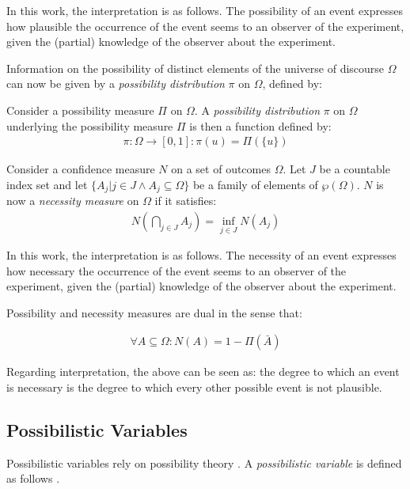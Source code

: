In this work, the interpretation is as follows. The possibility of an event expresses how plausible the occurrence of the event seems to an observer of the experiment, given the (partial) knowledge of the observer about the experiment.

Information on the possibility of distinct elements of the universe of discourse $\Omega$ can now be given by a \emph{possibility distribution} $\pi$ on $\Omega$, defined by:

\begin{definition}
Consider a possibility measure $\Pi$ on $\Omega$. A \emph{possibility distribution} $\pi$ on $\Omega$ underlying the possibility measure $\Pi$ is then a function defined by:
	\begin{align}
	\pi : \Omega \rightarrow \left[0, 1\right] : \pi(u) = \Pi(\{u\})
	\end{align}
\end{definition}

\begin{definition}
Consider a confidence measure $N$ on a set of outcomes $\Omega$. Let $J$ be a countable index set and let $\{ A_{j} | j \in J \wedge A_{j} \subseteq \Omega \}$ be a family of elements of $\wp(\Omega)$. $N$ is now a \emph{necessity measure} on $\Omega$ if it satisfies:
	\begin{align}
	N\left(\bigcap_{j \in J} A_{j} \right) = \inf_{j \in J} N(A_{j})
	\end{align}
\end{definition}

In this work, the interpretation is as follows. The necessity of an event expresses how necessary the occurrence of the event seems to an observer of the experiment, given the (partial) knowledge of the observer about the experiment.

Possibility and necessity measures are dual in the sense that:

\begin{align}
\forall A \subseteq \Omega : N(A) = 1 - \Pi(\bar{A})
\end{align}

Regarding interpretation, the above can be seen as: the degree to which an event is necessary is the degree to which every other possible event is not plausible.

\subsection{\label{subsec:possibilistic-variables}Possibilistic Variables}
Possibilistic variables rely on possibility theory \cite{Dubois1988a}. A \emph{possibilistic variable} is defined as follows \cite{Pons2011}.

